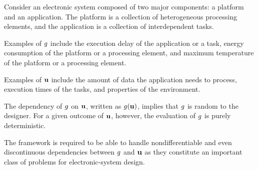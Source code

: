 Consider an electronic system composed of two major components: a platform and
an application. The platform is a collection of heterogeneous processing
elements, and the application is a collection of interdependent tasks.

 Examples of $g$ include the execution delay of the application or
a task, energy consumption of the platform or a processing element, and maximum
temperature of the platform or a processing element.

 Examples of $\mathbf{u}$ include the amount of data the
application needs to process, execution times of the tasks, and properties of
the environment.

 The
dependency of $g$ on $\mathbf{u}$, written as $g(\mathbf{u})$, implies that $g$ is random
to the designer. For a given outcome of $\mathbf{u}$, however, the evaluation of $g$
is purely deterministic. 

 The framework is required to be able to handle
nondifferentiable and even discontinuous dependencies between $g$ and $\mathbf{u}$ as
they constitute an important class of problems for electronic-system design.
